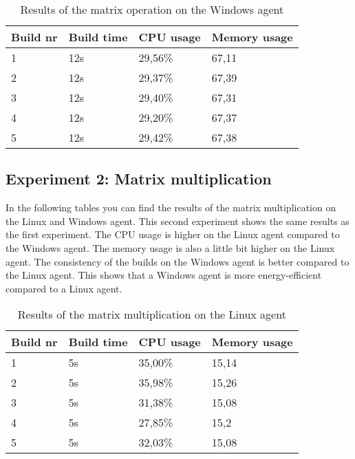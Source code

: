 \begin{table}[H]
\centering
\begin{tabular}{|l|l|l|l|}
\hline
Build nr & Build time & CPU usage & Memory usage \\ \hline
1        & 12s        & 29,56\%   & 67,11       \\ \hline
2        & 12s        & 29,37\%   & 67,39       \\ \hline
3        & 12s        & 29,40\%   & 67,31       \\ \hline
4        & 12s        & 29,20\%   & 67,37       \\ \hline
5        & 12s        & 29,42\%   & 67,38       \\ \hline
\end{tabular}
\caption{Results of the matrix operation on the Windows agent}
\end{table}

\subsection{Experiment 2: Matrix multiplication}
In the following tables you can find the results of the matrix multiplication on the Linux and Windows agent. This second experiment shows the same results as the first experiment. The CPU usage is higher on the Linux agent compared to the Windows agent. The memory usage is also a little bit higher on the Linux agent. The consistency of the builds on the Windows agent is better compared to the Linux agent. This shows that a Windows agent is more energy-efficient compared to a Linux agent.
\begin{table}
\centering
\begin{tabular}{|l|l|l|l|}
\hline
Build nr & Build time & CPU usage & Memory usage \\ \hline
1        & 5s         & 35,00\%   & 15,14       \\ \hline
2        & 5s         & 35,98\%   & 15,26       \\ \hline
3        & 5s         & 31,38\%   & 15,08       \\ \hline
4        & 5s         & 27,85\%   & 15,2        \\ \hline
5        & 5s         & 32,03\%   & 15,08       \\ \hline
\end{tabular}
\caption{Results of the matrix multiplication on the Linux agent}
\end{table}

